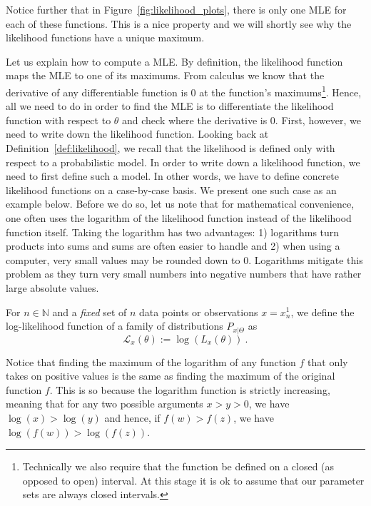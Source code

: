 Notice further that in Figure~\ref{fig:likelihood_plots}, there is only one MLE for each of these functions. This is a nice property and we will shortly see why the likelihood functions have a unique maximum.

Let us explain how to compute a MLE. By definition, the likelihood function maps the MLE to
one of its maximums. From calculus we know that the derivative of any differentiable function is 0 at the
function's maximums\footnote{Technically we also require that the function be defined on a closed 
(as opposed to open) interval. At this stage it is ok to assume that our parameter sets are always closed
intervals.}. Hence, all we need to do in order to find the MLE is to differentiate the likelihood 
function with respect to $ \theta $ and check where the derivative is 0. 
First, however, we need to write down the likelihood function.
Looking back at Definition~\ref{def:likelihood}, we recall that the likelihood is defined only
with respect to a probabilistic model. In order to write down a likelihood function, we need to first
define such a model. In other words, we have to define concrete likelihood functions on a case-by-case 
basis. We present one such case as an example below. Before we do so, let us note that for mathematical
convenience, one often uses the logarithm of the likelihood function instead of the likelihood function
itself. Taking the logarithm has two advantages: 1) logarithms turn products into sums and sums are often easier to handle
and 2) when using a computer, very small values may be rounded down to 0. Logarithms mitigate this problem
as they turn very small numbers into negative numbers that have rather large absolute values.

\begin{Definition}
For $n \in \mathbb{N} $ and a \emph{fixed} set of $n$ data points or observations $ x = x^{1}_{n} $, we define the 
log-likelihood function of a 
family of distributions $ P_{x|\Theta} $ as 
$$ \mathcal{L}_{x}(\theta) := \log \left(L_{x}(\theta) \right) \ . $$
\end{Definition}

Notice that finding the maximum of the logarithm of any function $ f $ that only takes on positive values is the same as finding
the maximum of the original function $ f $. This is so because the logarithm function is strictly increasing, meaning that for any
two possible arguments $ x >y>0 $, we have $ \log(x) > \log(y) $ and hence, if $f(w) > f(z)$, we have $\log(f(w)) > \log(f(z))$.

